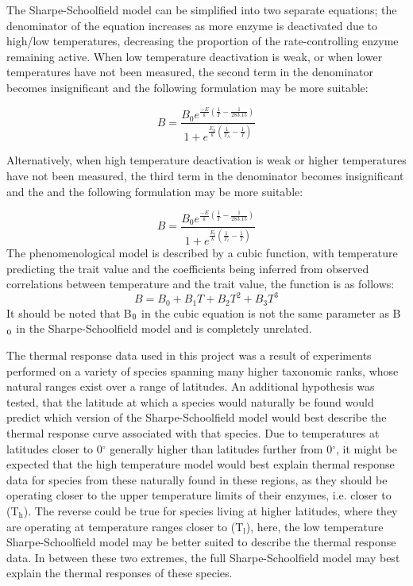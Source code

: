 \documentclass[a4paper, 11pt]{article}
\begin{document}
\begin{linenumbers}
The Sharpe-Schoolfield model can be simplified into two separate equations;  the denominator of the equation increases as more enzyme is deactivated due to high/low temperatures, decreasing  the proportion of the rate-controlling enzyme remaining active.  When low temperature deactivation is weak, or when lower temperatures have not been measured, the second term in the denominator becomes insignificant and the following formulation may be more suitable:

\begin{equation}
	B = \frac{B_{0}e^{\frac{-E}{k}(\frac{1}{T} - \frac{1}{283.15})}}{1 + e^{\frac{E_{h}}{k}(\frac{1}{T_{h}} - \frac{1}{T})}}
    \label{eqt:ShScHigh}
\end{equation}

Alternatively, when high temperature deactivation is weak or higher temperatures have not been measured, the third term in the denominator becomes insignificant and the and the following formulation may be more suitable:

\begin{equation}
	B = \frac{B_{0}e^{\frac{-E}{k}(\frac{1}{T} - \frac{1}{283.15})}}{1 + e^{\frac{E_{l}}{k}(\frac{1}{T_{l}} - \frac{1}{T})}}
    \label{eqt:ShScCold}
\end{equation}
The phenomenological model is described by a cubic function, with temperature predicting the trait value and the coefficients being inferred from observed correlations between temperature and the trait value, the function is as follows: 
\begin{equation}
	B = B_{0} + B_{1}T + B_{2}T^{2} + B_{3}T^{3}
    \label{eqt:cubic} 
\end{equation}It should be noted that B$\textsubscript0$ in the cubic equation is not the same parameter as B$\textsubscript0$ in the Sharpe-Schoolfield model and is completely unrelated. 

The thermal response data used in this project was a result of experiments performed on a variety of species spanning many higher taxonomic ranks, whose natural ranges exist over a range of latitudes. An additional hypothesis was tested, that the latitude at which a species would naturally be found would predict which version of the Sharpe-Schoolfield model would best describe the thermal response curve associated with that species.  Due to temperatures at latitudes closer to 0$^{\circ}$ generally higher than latitudes further from 0$^{\circ}$, it might be expected that the high temperature model would best explain thermal response data for species from these naturally found in these regions, as they should be operating closer to the upper temperature limits of their enzymes, i.e. closer to (T$_{\text{h}}$). The reverse could be true for species living at higher latitudes, where they are operating at temperature ranges closer to (T$_{\text{l}}$), here, the low temperature Sharpe-Schoolfield model may be better suited to describe the thermal response data. In between these two extremes, the full Sharpe-Schoolfield  model may best explain the thermal responses of these species.   


\end{linenumbers}
\end{document}
